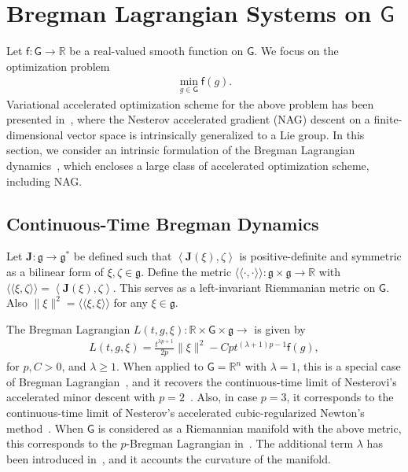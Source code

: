 \documentclass[letterpaper, 10pt, conference]{ieeeconf}
\newcommand{\G}{\ensuremath{\mathsf{G}}}
\renewcommand{\Re}{\ensuremath{\mathbb{R}}}
\newcommand{\pair}[1]{\ensuremath{\left\langle #1 \right\rangle}}
\newcommand{\met}[1]{\ensuremath{\langle\!\langle #1 \rangle\!\rangle}}
\newcommand{\g}{\ensuremath{\mathfrak{g}}}
\begin{document}
\section{Bregman Lagrangian Systems on $\G$}

\newcommand{\obj}{\mathsf{f}}

Let $\obj:\G\rightarrow\Re$ be a real-valued smooth function on $\G$.
We focus on the optimization problem
\begin{align}
    \min_{g\in\G} \obj (g).
\end{align}
Variational accelerated optimization scheme for the above problem has been presented in~\cite{tao2020variational}, where the Nesterov accelerated gradient (NAG) descent on a finite-dimensional vector space is intrinsically generalized to a Lie group. 
In this section, we consider an intrinsic formulation of the Bregman Lagrangian dynamics~\cite{wibisono2016variational}, which encloses a large class of accelerated optimization scheme, including NAG.

\subsection{Continuous-Time Bregman Dynamics}

Let $\mathbf{J}:\g\rightarrow\g^*$ be defined such that $\pair{\mathbf{J}(\xi),\zeta}$ is positive-definite and symmetric as a bilinear form of $\xi,\zeta\in\g$.
Define the metric $\met{\cdot,\cdot}:\g\times\g\rightarrow\Re$ with $\met{\xi,\zeta} = \pair{\mathbf{J}(\xi),\zeta}$.
This serves as a left-invariant Riemmanian metric on $\G$.
Also $\|\xi\|^2 = \met{\xi,\xi}$ for any $\xi\in\g$.

The Bregman Lagrangian $L(t,g,\xi):\Re\times\G\times\g\rightarrow$ is given by
\begin{align}
    L(t,g,\xi) = \frac{t^{\lambda p+1}}{2p} \|\xi\|^2 - C p t^{(\lambda+1)p-1} \obj (g),\label{eqn:BL}
\end{align}
for $p, C>0$, and $\lambda\geq 1$.
When applied to $\G=\Re^n$ with $\lambda=1$, this is a special case of Bregman Lagrangian~\cite{wibisono2016variational}, and it recovers the continuous-time limit of Nesterovi's accelerated minor descent with $p=2$~\cite{nesterov2005smooth}.
Also, in case $p = 3$, it corresponds to the continuous-time limit of Nesterov’s accelerated cubic-regularized Newton’s method~\cite{nesterov2008accelerating}.
When $\G$ is considered as a Riemannian manifold with the above metric, this corresponds to the $p$-Bregman Lagrangian in~\cite{duruisseaux2021variational}.
The additional term $\lambda$ has been introduced in~\cite{alimisis2020continuous}, and it accounts the curvature of the manifold. 
\end{document}
